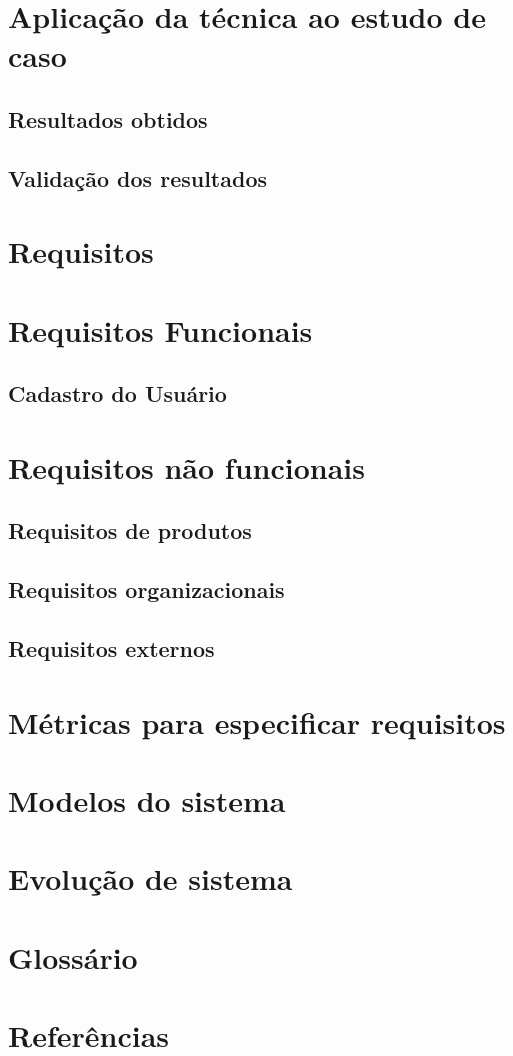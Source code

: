 \documentclass[letter]{article}
\begin{document}
\section{Aplicação da técnica ao estudo de caso}
\subsection{Resultados obtidos}
\subsection{Validação dos resultados}
\section{Requisitos}
\section{Requisitos Funcionais}
\subsection{Cadastro do Usuário}
\section{Requisitos não funcionais}
\subsection{Requisitos de produtos}
\subsection{Requisitos organizacionais}
\subsection{Requisitos externos}
\section{Métricas para especificar requisitos}
\section{Modelos do sistema}
\section{Evolução de sistema}
\section{Glossário}
\section{Referências}
\end{document}
